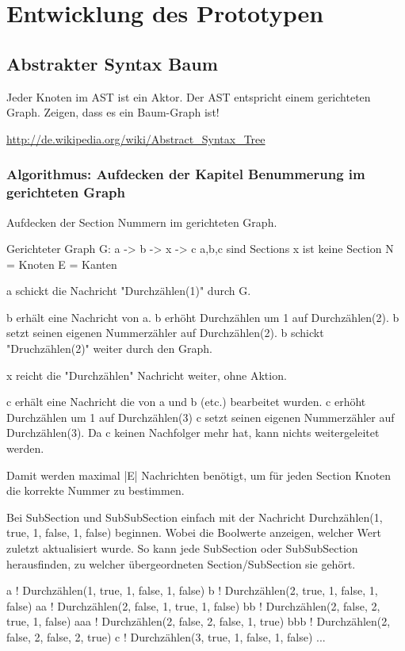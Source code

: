 \chapter{Entwicklung des Prototypen}


\section{Abstrakter Syntax Baum}

Jeder Knoten im AST ist ein Aktor. Der AST entspricht einem gerichteten Graph.
Zeigen, dass es ein Baum-Graph ist!

\url{http://de.wikipedia.org/wiki/Abstract_Syntax_Tree}


\subsection{Algorithmus: Aufdecken der Kapitel Benummerung im gerichteten Graph}

Aufdecken der Section Nummern im gerichteten Graph.

Gerichteter Graph G: a -> b -> x -> c
a,b,c sind Sections
x ist keine Section
N = Knoten
E = Kanten

a schickt die Nachricht "Durchzählen(1)" durch G.

b erhält eine Nachricht von a.
b erhöht Durchzählen um 1 auf Durchzählen(2).
b setzt seinen eigenen Nummerzähler auf Durchzählen(2).
b schickt "Druchzählen(2)" weiter durch den Graph.

x reicht die "Durchzählen" Nachricht weiter, ohne Aktion.

c erhält eine Nachricht die von a und b (etc.) bearbeitet wurden.
c erhöht Durchzählen um 1 auf Durchzählen(3)
c setzt seinen eigenen Nummerzähler auf Durchzählen(3).
Da c keinen Nachfolger mehr hat, kann nichts weitergeleitet werden.

Damit werden maximal |E| Nachrichten benötigt, um für jeden Section Knoten
die korrekte Nummer zu bestimmen.


Bei SubSection und SubSubSection einfach mit der
Nachricht Durchzählen(1, true, 1, false, 1, false) beginnen.
Wobei die Boolwerte anzeigen, welcher Wert zuletzt aktualisiert wurde.
So kann jede SubSection oder SubSubSection herausfinden, zu welcher
übergeordneten Section/SubSection sie gehört.

a ! Durchzählen(1, true, 1, false, 1, false)
b ! Durchzählen(2, true, 1, false, 1, false)
aa ! Durchzählen(2, false, 1, true, 1, false)
bb ! Durchzählen(2, false, 2, true, 1, false)
aaa ! Durchzählen(2, false, 2, false, 1, true)
bbb ! Durchzählen(2, false, 2, false, 2, true)
c ! Durchzählen(3, true, 1, false, 1, false)
...

